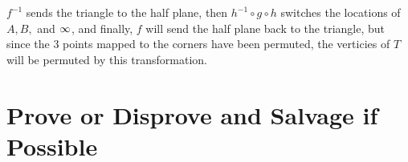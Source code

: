 \documentclass{homework}
\begin{document}
\begin{solution}
                                                                                                                        $f^{-1}$ sends the triangle to the half plane, then $h^{-1}\circ g\circ h$ switches the locations of $A,B,$ and $\infty$, and finally, $f$ will send the half plane back to the triangle, but since the 3 points mapped to the corners have been permuted, the verticies of $T$ will be permuted by this transformation. 
                                                                                                                        \end{solution}
                                                                                                                        \section{Prove or Disprove and Salvage if Possible}
\end{document}
